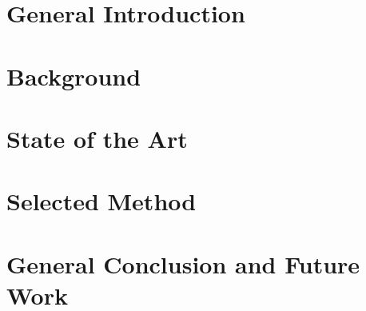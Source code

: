 ﻿\documentclass[12pt,a4paper]{report}
\begin{document}








\tableofcontents
\listoffigures
\listoftables
\clearpage


\part{General Introduction}


\part{Background}




\part{State of the Art}



\part{Selected Method}


\part{General Conclusion and Future Work}





\appendix

\end{document}
